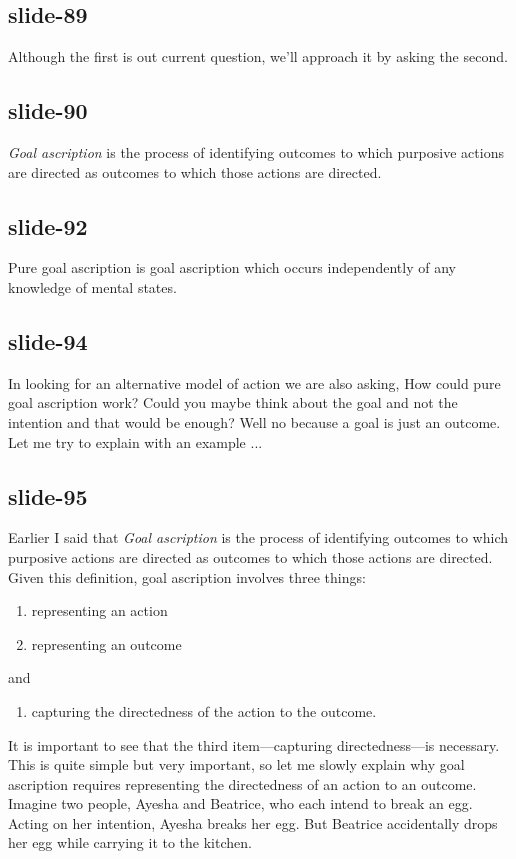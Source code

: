 \documentclass[12pt,\papersize]{extarticle}
\begin{document}
 
\subsection{slide-89}
Although the first is out current question, we'll approach it by asking the second.
 
 
\subsection{slide-90}
\newcommand{\dfGoalAscription}{\emph{Goal ascription} is the process of identifying outcomes to which purposive actions are directed as outcomes to which those actions are directed.}
\dfGoalAscription{}
 
 
\subsection{slide-92}
Pure goal ascription is goal ascription which occurs independently of any knowledge of mental states.
 
 
\subsection{slide-94}
In looking for an alternative model of action we are also asking, How could pure goal ascription work? Could you maybe think about the goal and not the intention and that would be enough? Well no because a goal is just an outcome. Let me try to explain with an example ...
 
 
\subsection{slide-95}
Earlier I said that \dfGoalAscription{} Given this definition, goal ascription involves three things: \begin{enumerate} \item representing an action \item representing an outcome \end{enumerate} and \begin{enumerate}[resume] \item capturing the directedness of the action to the outcome. \end{enumerate}  
It is important to see that the third item---capturing directedness---is necessary. This is quite simple but very important, so let me slowly explain why goal ascription requires representing the directedness of an action to an outcome. Imagine two people, Ayesha and Beatrice, who each intend to break an egg. Acting on her intention, Ayesha breaks her egg. But Beatrice accidentally drops her egg while carrying it to the kitchen.
 
\end{document}
